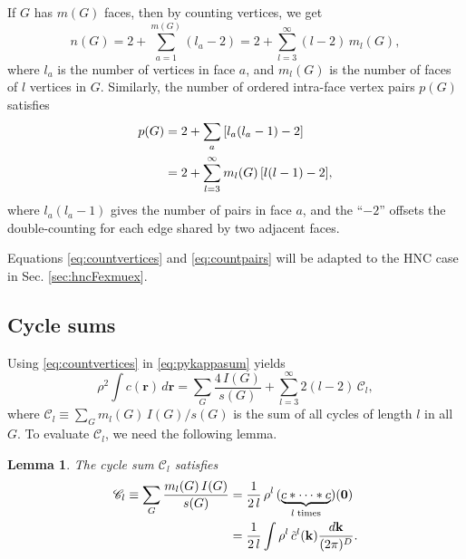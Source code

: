 \documentclass[preprint]{revtex4-1}
\newtheorem{lemm}[thrm]{Lemma}
\newcommand{\vct}[1]{\mathbf{#1}}
\providecommand{\vr}{} %
\renewcommand{\vr}{\vct{r}}
\newcommand{\vk}{\vct{k}}
\newcommand{\dvk}{\frac{d\vk}{(2\pi)^D}}
\newcommand{\Chn}{\mathscr{C}}
\begin{document}
If $G$ has $m(G)$ faces, then by counting vertices, we get
%
\begin{equation}
  n(G) = 2 + \sum_{a = 1}^{m(G)} (l_a - 2)
       = 2 + \sum_{l = 3}^\infty (l - 2) \, m_l(G),
\label{eq:countvertices}
\end{equation}
%
where
  $l_a$ is the number of vertices in face $a$,
%
and
  $m_l(G)$ is the number of faces of $l$ vertices in $G$.
%
Similarly, the number of ordered intra-face vertex pairs
  $p(G)$ satisfies
%
\begin{align}
  p(G)  &= 2 + \sum_{a} \left[ l_a (l_a - 1) - 2 \right]
                        \notag \\
        &= 2 + \sum_{l = 3}^\infty m_l(G) \, [l(l-1) - 2],
\label{eq:countpairs}
\end{align}
%
where $l_a (l_a - 1)$ gives the number of pairs in face $a$,
  and the ``$-2$'' %
  offsets the double-counting
  for each edge shared by two adjacent faces.

Equations \eqref{eq:countvertices} and \eqref{eq:countpairs}
will be adapted to the HNC case in Sec. \ref{sec:hncFexmuex}.




\subsection{Cycle sums}

Using \eqref{eq:countvertices} in \eqref{eq:pykappasum} yields
%
\begin{equation}
    \rho^2 \int c(\vr) \, d\vr
  = \sum_G \frac{ 4 \, I(G) }{ s(G) }
  + \sum_{l = 3}^\infty 2 (l - 2) \, \Chn_l,
\label{eq:pyintgcr2sums}
\end{equation}
%
where
$\Chn_l \equiv \sum_G m_l(G) \, I(G) / s(G)$
is the sum of all cycles of length $l$ in all $G$.
%
To evaluate $\Chn_l$, we need the following lemma.

\begin{lemm}
The cycle sum $\Chn_l$ satisfies
\begin{align}
      \Chn_l
  \equiv
      \sum_G \frac{ m_l(G) \, I(G) } { s(G) }
  &=  \frac{1}{2 \, l} \,
      \rho^l \, (\underbrace{c*\cdots *c}_{l \; \mathrm{times}})(\vct 0)
      \notag \\
  &=  \frac{1}{2 \, l}
      \int \rho^l \, \tilde{c}^l(\vk) \dvk.
\label{eq:ccycling}
\end{align}
%
\end{lemm}
\end{document}
